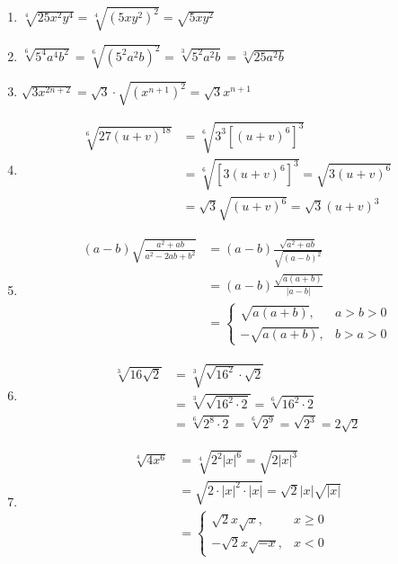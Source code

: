 \begin{solution}
\begin{enumerate}
    \item $\sqrt[4]{25 x^{2} y^{4}}=\sqrt[4]{\left(5 x y^{2}\right)^{2}}=\sqrt{5 x y^{2}}$
    \item $\sqrt[6]{5^{4} a^{4} b^{2}}=\sqrt[6]{\left(5^{2} a^{2} b\right)^{2}}=\sqrt[3]{5^{2} a^{2} b}=\sqrt[3]{25 a^{2} b}$
    \item $\sqrt{3 x^{2 n+2}}=\sqrt{3} \cdot \sqrt{\left(x^{n+1}\right)^{2}}=\sqrt{3} x^{n+1}$
    \item \[\begin{split}
        \sqrt[6]{27(u+v)^{18}}&=\sqrt[6]{3^3\left[(u+v)^{6}\right]^{3}}\\
        &=\sqrt[6]{[3 (u+v)^{6}]^3}=\sqrt{3(u+v)^{6}}
        \\
        &=\sqrt{3}\sqrt{(u+v)^6}=\sqrt{3}(u+v)^3
    \end{split}\]
    \item \[\begin{split}
        (a-b) \sqrt{\frac{a^{2}+a b}{a^{2}-2 a b+b^{2}}}&=(a-b) \frac{\sqrt{a^2+ab}}{\sqrt{(a-b)^2}}\\
        &=(a-b)\frac{\sqrt{a(a+b)}}{|a-b|}\\
        &=\begin{cases}
            \sqrt{a(a+b)}, & a>b>0\\
            -\sqrt{a(a+b)}, & b>a>0
        \end{cases}
    \end{split}\]
\item \[\begin{split}
    \sqrt[3]{16 \sqrt{2}}&=\sqrt[3]{\sqrt{16^2}\cdot \sqrt{2}}\\
    &=\sqrt[3]{\sqrt{16^2 \cdot 2}}=\sqrt[6]{16^2 \cdot 2}\\
    &=\sqrt[6]{2^8\cdot 2}=\sqrt[6]{2^9}=\sqrt{2^3}=2\sqrt{2}
\end{split}\]
\item \[\begin{split}
    \sqrt[4]{4 x^{6}}&=\sqrt[4]{2^2 |x|^{6}}=\sqrt{2|x|^3}\\
    &=\sqrt{2\cdot |x|^2\cdot |x|}=\sqrt{2}|x|\sqrt{|x|}\\
    &=\begin{cases}
        \sqrt{2}x\sqrt{x} , & x\ge 0\\
        -\sqrt{2}x\sqrt{-x} , & x<0
    \end{cases}
\end{split}\]
\end{enumerate}
\end{solution}


